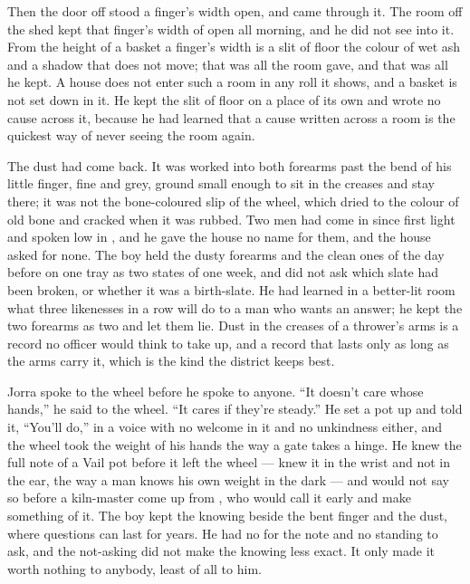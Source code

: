 Then the door off  stood a finger's width open, and  came through it. The room off the shed kept that finger's width of open all morning, and he did not see into it. From the height of a basket a finger's width is a slit of floor the colour of wet ash and a shadow that does not move; that was all the room gave, and that was all he kept. A house does not enter such a room in any roll it shows, and a basket is not set down in it. He kept the slit of floor on a place of its own and wrote no cause across it, because he had learned that a cause written across a room is the quickest way of never seeing the room again.

The dust had come back. It was worked into both forearms past the bend of his little finger, fine and grey, ground small enough to sit in the creases and stay there; it was not the bone-coloured slip of the wheel, which dried to the colour of old bone and cracked when it was rubbed. Two men had come in since first light and spoken low in , and he gave the house no name for them, and the house asked for none. The boy held the dusty forearms and the clean ones of the day before on one tray as two states of one week, and did not ask which slate had been broken, or whether it was a birth-slate. He had learned in a better-lit room what three likenesses in a row will do to a man who wants an answer; he kept the two forearms as two and let them lie. Dust in the creases of a thrower's arms is a record no officer would think to take up, and a record that lasts only as long as the arms carry it, which is the kind the district keeps best.

Jorra spoke to the wheel before he spoke to anyone. “It doesn't care whose hands,” he said to the wheel. “It cares if they're steady.” He set a pot up and told it, “You'll do,” in a voice with no welcome in it and no unkindness either, and the wheel took the weight of his hands the way a gate takes a hinge. He knew the full note of a Vail pot before it left the wheel --- knew it in the wrist and not in the ear, the way a man knows his own weight in the dark --- and would not say so before a kiln-master come up from , who would call it early and make something of it. The boy kept the knowing beside the bent finger and the dust, where questions can last for years. He had no  for the note and no standing to ask, and the not-asking did not make the knowing less exact. It only made it worth nothing to anybody, least of all to him.

